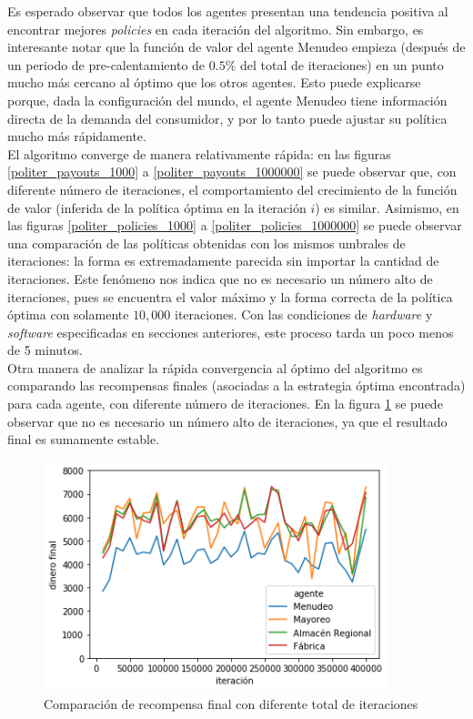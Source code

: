 Es esperado observar  que todos los agentes presentan una tendencia positiva al encontrar mejores \textit{policies} en cada iteraci\'on del algoritmo. Sin embargo, es interesante notar que la funci\'on de valor del agente Menudeo empieza (despu\'es de un periodo de pre-calentamiento de $0.5\%$ del total de iteraciones) en un punto mucho m\'as cercano al \'optimo que los otros agentes. Esto puede explicarse porque, dada la configuraci\'on del mundo, el agente Menudeo tiene informaci\'on directa de la demanda del consumidor, y por lo tanto puede ajustar su pol\'itica mucho m\'as r\'apidamente.\\

El algoritmo converge de manera relativamente r\'apida: en las figuras  \ref{politer_payouts_1000} a \ref{politer_payouts_1000000} se puede observar que, con diferente n\'umero de iteraciones, el comportamiento del crecimiento de la funci\'on de valor (inferida de la pol\'itica \'optima en la iteraci\'on $i$) es similar. Asimismo, en las figuras \ref{politer_policies_1000} a \ref{politer_policies_1000000} se puede observar una comparaci\'on de las pol\'iticas obtenidas con los mismos umbrales de iteraciones: la forma es extremadamente parecida sin importar la cantidad de iteraciones. Este fen\'omeno nos indica que no es necesario un n\'umero alto de iteraciones, pues se encuentra el valor m\'aximo y la forma correcta de la pol\'itica \'optima con solamente $10,000$ iteraciones. Con las condiciones de \textit{hardware} y \textit{software} especificadas en secciones anteriores, este proceso tarda un poco menos de 5 minutos.\\

Otra manera de analizar la r\'apida convergencia al \'optimo del algoritmo es comparando las recompensas finales (asociadas a la estrategia \'optima encontrada) para cada agente, con diferente n\'umero de iteraciones. En la figura \ref{money_over_time} se puede observar que no es necesario un n\'umero alto de iteraciones, ya que el resultado final es sumamente estable.\\

\begin{figure}[H]
\caption{Comparaci\'on de recompensa final con diferente total de iteraciones}
\label{money_over_time}
\includegraphics[width=10cm]{tesis_tex/figs/evaluating_interations_money.png}
\centering
\end{figure}

